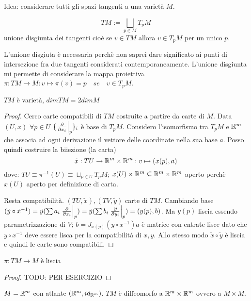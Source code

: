 Idea: considerare tutti gli spazi tangenti a una varietà $M$. 
\begin{definition}
    \begin{displaymath}
       TM:=\bigsqcup_{p\in M}T_pM  
    \end{displaymath}
    unione disgiunta dei tangenti cioè se $v\in TM$ allora $v\in
    T_pM$ per un unico $p$.
\end{definition}
L'unione disgiuta è necessaria perchè non saprei dare significato
ai punti di intersezione fra due tangenti considerati
contemporaneamente. L'unione disgiunta mi permette di considerare
la mappa proiettiva $\pi:TM\to M:v\mapsto \pi(v)=p
\quad se\quad v\in T_pM$.
\begin{obs}
    $TM$ è varietà, $dim TM=2dim M$
\end{obs}
\begin{proof}
    Cerco carte compatibili di $TM$ costruite a partire da carte di
    $M$. Data $(U,x)$ $\forall p\in U$ $\{\eval{\pdv{x_i}}_p\}_i$ è
    base di $T_pM$. Considero l'isomorfismo tra $T_pM$ e $\mathbb{R}^m$ che
    associa ad ogni derivazione il vettore delle coordinate nella
    sua base $a$. Posso quindi costruire la biiezione (la carta)
    \begin{displaymath}
        \tilde{x}:TU\to\mathbb{R}^m\times\mathbb{R}^m:v\mapsto(x(p),a)
    \end{displaymath}
    dove: $TU\equiv\pi^{-1}(U)\equiv\sqcup_{p\in U}T_pM$; 
    $x(U)\times\mathbb{R}^m\subseteq\mathbb{R}^m\times\mathbb{R}^m$ aperto perchè $x(U)$
    aperto per definizione di carta.

    Resta compatibilità. $(TU,\tilde{x}),(TV,\tilde{y})$ carte di
    $TM$. Cambiando base $(\tilde{y}\circ\tilde{x}^{-1})=
    \tilde{y}(\sum a_i\eval{\pdv{x_i}}_p)= \tilde{y}(\sum
    b_i\eval{\pdv{y_i}}_p)= (y(p),b)$. Ma $y(p)$ liscia essendo
    parametrizzazione di $V$; $b=J_{x(p)}(y\circ x^{-1})a$ è
    matrice con entrate lisce dato che $y\circ x^{-1}$ deve essere
    lisca per la compatibilità di $x,y$. Allo stesso modo
    $\tilde{x}\circ\tilde{y}$ è liscia e quindi le carte sono
    compatibili.
\end{proof}

\begin{obs}
    $\pi:TM\to M$ è liscia
\end{obs}
\begin{proof}
    TODO: PER ESERCIZIO
\end{proof}

\begin{ex}
    $M=\mathbb{R}^m$ con atlante $(\mathbb{R}^m,id_{\mathbb{R}^m})$. $TM$ è diffeomorfo a
    $\mathbb{R}^m\times\mathbb{R}^m$ ovvero a $M\times M$.
\end{ex}

